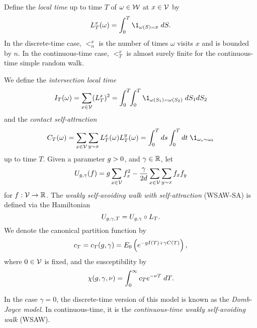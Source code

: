 Define the \emph{local time} up to time $T$ of $\omega \in \mathcal{W}$ at
$x \in \mathcal{V}$ by
\begin{equation}
\label{e:LTx-def}
\lt^x_T(\omega) = \int_0^T \1_{\omega(S)=x} \; dS.
\end{equation}
In the discrete-time case, $\lt^x_n$ is the number of times $\omega$ visits $x$
and is bounded by $n$. In the continuous-time case, $\lt^x_T$ is almost surely
finite for the continuous-time simple random walk.

We define the \emph{intersection local time}
\begin{equation}
\label{e:ITdef}
I_T(\omega) = \sum_{x\in\vertices} (\lt^x_T)^2
  =
\int_0^T \!\! \int_0^T \1_{\omega(S_1)=\omega(S_2)} \; dS_1 dS_2
\end{equation}
and the \emph{contact self-attraction}
\begin{equation}
\label{e:CTdef}
C_T(\omega)
	=
\sum_{x \in \vertices} \sum_{y \sim x} \lt_T^x(\omega) \lt_T^y(\omega)
	=
\int_0^T ds \int_0^T dt \; \1_{\omega_s \sim \omega_t}
\end{equation}
up to time $T$.
Given a parameter $g > 0$, and $\gamma \in {\mathbb R}$, let
\begin{equation}
\label{e:Udef-neg}
U_{g,\gamma}(f)
=
g \sum_{x\in\mathcal{V}} f_x^2
- \frac{\gamma}{2d}
\sum_{x\in\mathcal{V}} \sum_{y \sim x} f_x f_y
\end{equation}
for $f : \mathcal{V} \rightarrow {\mathbb R}$.
The \emph{weakly self-avoiding walk with self-attraction} (WSAW-SA) is defined via the Hamiltonian
\begin{equation}
U_{g,\gamma,T} = U_{g,\gamma} \circ L_T.
\end{equation}
We denote the canonical partition function by
\begin{equation}
c_T = c_T(g, \gamma) = E_0 \left( e^{-g I(T) + \gamma C(T)} \right),
\end{equation}
where $0 \in \mathcal{V}$ is fixed, and the susceptibility by
\begin{equation}
\chi(g, \gamma, \nu) = \int_0^\infty c_T e^{-\nu T} \; dT.
\end{equation}

In the case $\gamma = 0$, the discrete-time version of this model is known as
the \emph{Domb-Joyce model}. In continuous-time, it is the
\emph{continuous-time weakly self-avoiding walk} (WSAW).



